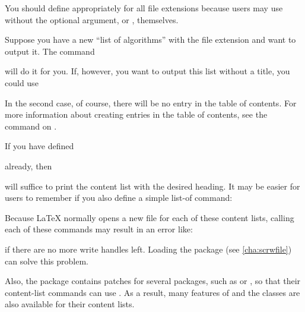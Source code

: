 You should define 
appropriately for all file extensions because users may use 
without the optional argument, or , themselves.
\begin{Example}
 Suppose you have a new ``list of algorithms'' with the file extension
  and want to output it. The command
\begin{lstcode}
\end{lstcode}
  will do it for you. If, however, you want to output this list without a
  title, you could use
\begin{lstcode}
\end{lstcode}
  In the second case, of course, there will be no entry in the table of
  contents. For more information about creating entries in the table of
  contents, see the  command on
  .

  If you have defined
\begin{lstcode}
  \newcommand*{\listofloaname}{%
    List of Algorithms%
  }
\end{lstcode}
  already, then
\begin{lstcode}
\end{lstcode}
  will suffice to print the content list with the desired heading. It may be
  easier for users to remember if you also define a simple list-of command:
\begin{lstcode}
  \newcommand*{\listofalgorithms}{\listoftoc{loa}}
\end{lstcode}
\end{Example}

Because \LaTeX{} normally opens a new file for each of
these content lists, calling each of these commands may
result in an error like:
if there are no more write handles left. Loading the
package (see \autoref{cha:scrwfile}) can solve this problem.

Also, the \hyperref[cha:scrhack]{}%
 package contains patches
for several packages, such as  or , so that
their content-list commands can use . As a result, many
features of  and the \KOMAScript{} classes are also
available for their content lists.%
\EndIndexGroup


